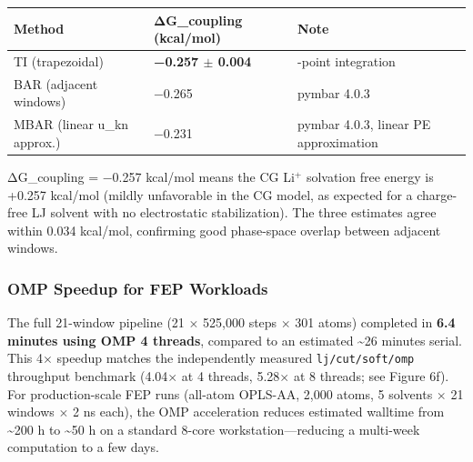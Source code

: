\documentclass[
  11pt,
]{article}
\newcounter{none} %
\begin{document}
{\def\LTcaptype{none} %
\begin{longtable}[]{@{}
  >{\raggedright\arraybackslash}p{}
  >{\raggedright\arraybackslash}p{}
  >{\raggedright\arraybackslash}p{}@{}}
\toprule\noalign{}
\begin{minipage}[b]{\linewidth}\raggedright
Method
\end{minipage} & \begin{minipage}[b]{\linewidth}\raggedright
ΔG\_coupling (kcal/mol)
\end{minipage} & \begin{minipage}[b]{\linewidth}\raggedright
Note
\end{minipage} \\
\midrule\noalign{}
\endhead
\bottomrule\noalign{}
\endlastfoot
TI (trapezoidal) & \textbf{−0.257 \(\pm\) 0.004} & 21-point
integration \\
BAR (adjacent windows) & −0.265 & pymbar 4.0.3 \\
MBAR (linear u\_kn approx.) & −0.231 & pymbar 4.0.3, linear PE
approximation \\
\end{longtable}
}

ΔG\_coupling = −0.257 kcal/mol means the CG Li\(^{+}\) solvation free
energy is +0.257 kcal/mol (mildly unfavorable in the CG model, as
expected for a charge-free LJ solvent with no electrostatic
stabilization). The three estimates agree within 0.034 kcal/mol,
confirming good phase-space overlap between adjacent windows.

\subsubsection{OMP Speedup for FEP
Workloads}\label{omp-speedup-for-fep-workloads}

The full 21-window pipeline (21 \(\times\) 525,000 steps \(\times\) 301
atoms) completed in \textbf{6.4 minutes using OMP 4 threads}, compared
to an estimated \textasciitilde26 minutes serial. This 4\(\times\)
speedup matches the independently measured \texttt{lj/cut/soft/omp}
throughput benchmark (4.04\(\times\) at 4 threads, 5.28\(\times\) at 8
threads; see Figure 6f). For production-scale FEP runs (all-atom
OPLS-AA, 2,000 atoms, 5 solvents \(\times\) 21 windows \(\times\) 2 ns
each), the OMP acceleration reduces estimated walltime from
\textasciitilde200 h to \textasciitilde50 h on a standard 8-core
workstation---reducing a multi-week computation to a few days.
\end{document}
